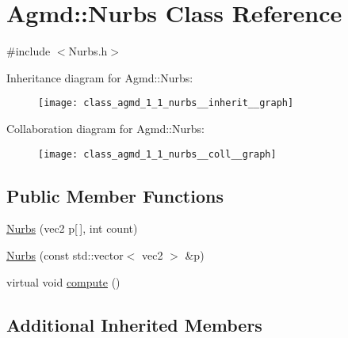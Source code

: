 \hypertarget{class_agmd_1_1_nurbs}{\section{Agmd\+:\+:Nurbs Class Reference}
\label{class_agmd_1_1_nurbs}
}


{\ttfamily \#include $<$Nurbs.\+h$>$}



Inheritance diagram for Agmd\+:\+:Nurbs\+:\nopagebreak
\begin{figure}[H]
\begin{center}
\leavevmode
\texttt{[image: class\_agmd\_1\_1\_nurbs\_\_inherit\_\_graph]}
\end{center}
\end{figure}


Collaboration diagram for Agmd\+:\+:Nurbs\+:\nopagebreak
\begin{figure}[H]
\begin{center}
\leavevmode
\texttt{[image: class\_agmd\_1\_1\_nurbs\_\_coll\_\_graph]}
\end{center}
\end{figure}
\subsection*{Public Member Functions}
\begin{DoxyCompactItemize}
\item 
\hyperlink{class_agmd_1_1_nurbs_a8b818f46c41cec7653145d719d83c35f}{Nurbs} (vec2 p\mbox{[}$\,$\mbox{]}, int count)
\item 
\hyperlink{class_agmd_1_1_nurbs_a8bb8f6a838c13cf231b14774cff1daaa}{Nurbs} (const std\+::vector$<$ vec2 $>$ \&p)
\item 
virtual void \hyperlink{class_agmd_1_1_nurbs_a8d2c4d1307a198fd0aafcdc464f2ba7e}{compute} ()
\end{DoxyCompactItemize}
\subsection*{Additional Inherited Members}


